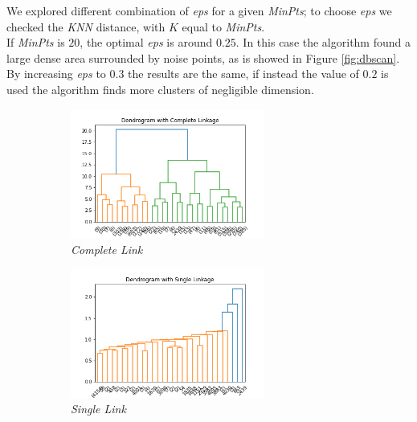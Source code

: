 We explored different combination of \emph{eps} for a given \emph{MinPts}; to choose \emph{eps} we checked the \emph{KNN} distance, with $K$ equal to \emph{MinPts}.\\
If \emph{MinPts} is $20$, the optimal \emph{eps} is around $0.25$. In this case the algorithm found a large dense area surrounded by noise points, as is showed in Figure \ref{fig:dbscan}. By increasing \emph{eps} to $0.3$ the results are the same, if instead the value of $0.2$ is used the algorithm finds more clusters of negligible dimension.\\

\begin{figure}[h!]
    \centering
    \begin{subfigure}{0.49\textwidth}
        \centering
        \includegraphics[width=0.7\textwidth]{img/clustering/c_link.png}
        \caption{\emph{Complete Link}}
        \label{fig:clink_img}
    \end{subfigure}
    \begin{subfigure}{0.49\textwidth}
        \centering
        \includegraphics[width=0.7\textwidth]{img/clustering/s_link.png}
        \caption{\emph{Single Link}}
        \label{fig:slink_img}
    \end{subfigure}
    \begin{subfigure}{0.49\textwidth}

\end{subfigure}
\end{figure}
